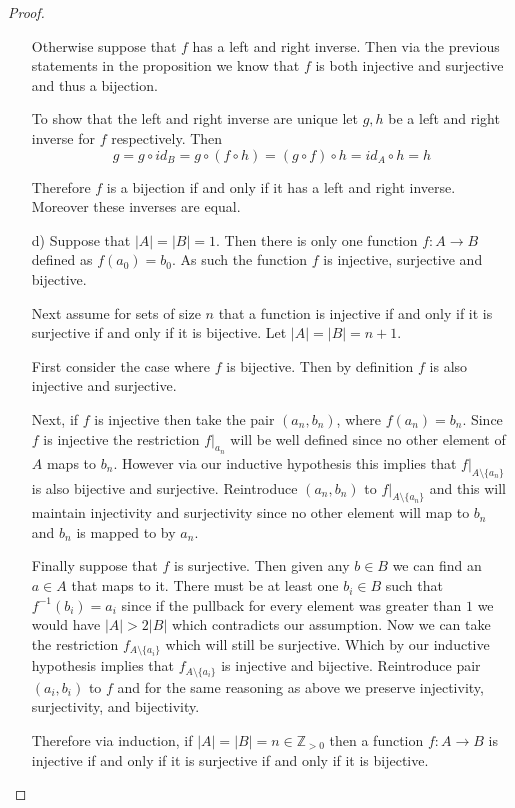 \documentclass[10pt]{article}
\newcommand{\bb}[1]{\mathbb{#1}}
\newcommand{\ra}{\rightarrow}
\theoremstyle{plain}
\theoremstyle{remark}
\begin{document}
\begin{proof}
\begin{itemize}
    Otherwise suppose that $f$ has a left and right inverse. Then via the previous
    statements in the proposition we know that $f$ is both injective and surjective and
    thus a bijection.

    To show that the left and right inverse are unique let $g,h$ be a left and right
    inverse for $f$ respectively. Then
    \[g=g\circ id_B=g\circ(f\circ h)=(g\circ f)\circ h=id_A\circ h=h\]

    Therefore $f$ is a bijection if and only if it has a left and right inverse.
    Moreover these inverses are equal.
  \item[d)]
    Suppose that $|A|=|B|=1$. Then there is only one function $f:A\ra B$
    defined as $f(a_0)=b_0$. As such the function $f$ is injective, surjective and
    bijective.

    Next assume for sets of size $n$ that a function is injective if and only if it
    is surjective if and only if it is bijective. Let $|A|=|B|=n+1$.

    First consider the case where $f$ is bijective. Then by definition $f$ is also
    injective and surjective.

    Next, if $f$ is injective then take the pair $(a_n,b_n)$, where
    $f(a_n)=b_n$. Since $f$ is injective the restriction $f|_{a_n}$ will be well
    defined since no other element of $A$ maps to $b_n$. However via our inductive
    hypothesis this implies that $f|_{A\setminus\{a_n\}}$ is also bijective and surjective.
    Reintroduce $(a_n,b_n)$ to $f|_{A\setminus\{a_n\}}$ and this will maintain injectivity and
    surjectivity since no other element will map to $b_n$ and $b_n$ is mapped to
    by $a_n$.

    Finally suppose that $f$ is surjective. Then given any $b\in B$ we can find an $a\in A$
    that maps to it. There must be at least one $b_i\in B$ such that $f^{-1}(b_i)=a_i$
    since if the pullback for every element was greater than $1$ we would have
    $|A|>2|B|$ which contradicts our assumption. Now we can take the restriction
    $f_{A\setminus\{a_i\}}$ which will still be surjective. Which by our inductive
    hypothesis implies that $f_{A\setminus\{a_i\}}$ is injective and bijective. Reintroduce
    pair $(a_i,b_i)$ to $f$ and for the same reasoning as above we preserve injectivity,
    surjectivity, and bijectivity.

    Therefore via induction, if $|A|=|B|=n\in \bb{Z}_{>0}$ then a function $f:A\ra B$ is
    injective if and only if it is surjective if and only if it is bijective.
  \end{itemize}
\end{proof}
\end{document}
